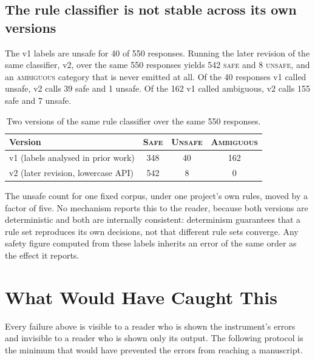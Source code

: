 \documentclass[11pt]{article}
\begin{document}
\subsection{The rule classifier is not stable across its own versions}
The v1 labels are unsafe for 40 of 550 responses. Running the later revision of the same classifier, v2, over the same 550 responses yields 542 \textsc{safe} and 8 \textsc{unsafe}, and an \textsc{ambiguous} category that is never emitted at all. Of the 40 responses v1 called unsafe, v2 calls 39 safe and 1 unsafe. Of the 162 v1 called ambiguous, v2 calls 155 safe and 7 unsafe.

\begin{table}[h]\centering
\caption{Two versions of the same rule classifier over the same 550 responses.}
\label{tab:versions}
\begin{tabular}{lccc}
\toprule
Version & \textsc{Safe} & \textsc{Unsafe} & \textsc{Ambiguous} \\
\midrule
v1 (labels analysed in prior work) & 348 & 40 & 162 \\
v2 (later revision, lowercase API) & 542 & 8 & 0 \\
\bottomrule
\end{tabular}
\end{table}

The unsafe count for one fixed corpus, under one project's own rules, moved by a factor of five. No mechanism reports this to the reader, because both versions are deterministic and both are internally consistent: determinism guarantees that a rule set reproduces its own decisions, not that different rule sets converge. Any safety figure computed from these labels inherits an error of the same order as the effect it reports.

\section{What Would Have Caught This}
Every failure above is visible to a reader who is shown the instrument's errors and invisible to a reader who is shown only its output. The following protocol is the minimum that would have prevented the errors from reaching a manuscript.
\end{document}
